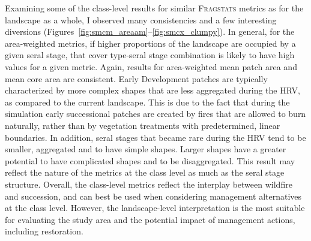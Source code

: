Examining some of the class-level results for similar \textsc{Fragstats} metrics as for the landscape as a whole, I observed many consistencies and a few interesting diversions (Figures~\ref{fig:smcm_areaam}--\ref{fig:smcx_clumpy}). In general, for the area-weighted metrics, if higher proportions of the landscape are occupied by a given seral stage, that cover type-seral stage combination is likely to have high values for a given metric. Again, results for area-weighted mean patch area and mean core area are consistent. Early Development patches are typically characterized by more complex shapes that are less aggregated during the HRV, as compared to the current landscape. This is due to the fact that during the simulation early successional patches are created by fires that are allowed to burn naturally, rather than by vegetation treatments with predetermined, linear boundaries. In addition, seral stages that became rare during the HRV tend to be smaller, aggregated and to have simple shapes. Larger shapes have a greater potential to have complicated shapes and to be disaggregated. This result may reflect the nature of the metrics at the class level as much as the seral stage structure. Overall, the class-level metrics reflect the interplay between wildfire and succession, and can best be used when considering management alternatives at the class level. However, the landscape-level interpretation is the most suitable for evaluating the study area and the potential impact of management actions, including restoration. 

\clearpage

